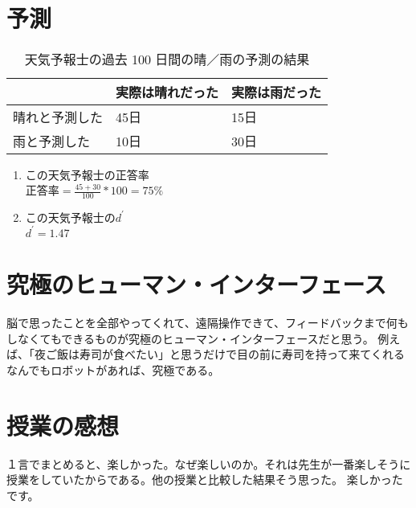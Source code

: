 \documentclass[twocolumn, 10pt,a4j]{jsarticle}
\begin{document}
\section{予測}
\begin{table}[H]
  \centering
  \caption{天気予報士の過去 100 日間の晴／雨の予測の結果}
  \label{my-label}
  \footnotesize
  \begin{tabular}{lll}
  & 実際は晴れだった & 実際は雨だった  \\ \hline
  晴れと予測した& 45日& 15日\\
  雨と予測した& 10日 &30日
  \end{tabular}
\end{table}
\begin{enumerate}
  \item この天気予報士の正答率 \\
    $正答率 = \frac{45 + 30}{100} * 100 = 75\%$
  \item この天気予報士の$d^{'}$ \\
    $d^{'} = 1.47$
\end{enumerate}


\section{究極のヒューマン・インターフェース}
脳で思ったことを全部やってくれて、遠隔操作できて、フィードバックまで何も
しなくてもできるものが究極のヒューマン・インターフェースだと思う。
例えば、「夜ご飯は寿司が食べたい」と思うだけで目の前に寿司を持って来てくれる
なんでもロボットがあれば、究極である。

\section{授業の感想}
１言でまとめると、楽しかった。なぜ楽しいのか。それは先生が一番楽しそうに
授業をしていたからである。他の授業と比較した結果そう思った。
楽しかったです。
\end{document}
